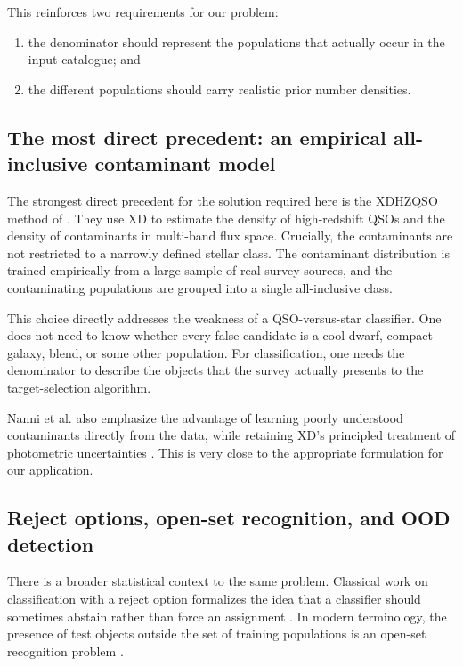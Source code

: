 \documentclass[11pt]{article}
\begin{document}
This reinforces two requirements for our problem:

\begin{enumerate}[label=(\arabic*)]
\item the denominator should represent the populations that actually occur in
the input catalogue; and
\item the different populations should carry realistic prior number densities.
\end{enumerate}

\subsection{The most direct precedent: an empirical all-inclusive contaminant model}

The strongest direct precedent for the solution required here is the XDHZQSO
method of \citet{nanni2022}. They use XD to estimate the density of
high-redshift QSOs and the density of contaminants in multi-band flux space.
Crucially, the contaminants are not restricted to a narrowly defined stellar
class. The contaminant distribution is trained empirically from a large sample
of real survey sources, and the contaminating populations are grouped into a
single all-inclusive class.

This choice directly addresses the weakness of a QSO-versus-star classifier.
One does not need to know whether every false candidate is a cool dwarf,
compact galaxy, blend, or some other population. For classification, one needs
the denominator to describe the objects that the survey actually presents to
the target-selection algorithm.

Nanni et al. also emphasize the advantage of learning poorly understood
contaminants directly from the data, while retaining XD's principled treatment
of photometric uncertainties \citep{nanni2022}. This is very close to the
appropriate formulation for our application.

\subsection{Reject options, open-set recognition, and OOD detection}

There is a broader statistical context to the same problem. Classical work on
classification with a reject option formalizes the idea that a classifier
should sometimes abstain rather than force an assignment
\citep{chow1970}. In modern terminology, the presence of test objects outside
the set of training populations is an open-set recognition problem
\citep{scheirer2013}.
\end{document}
